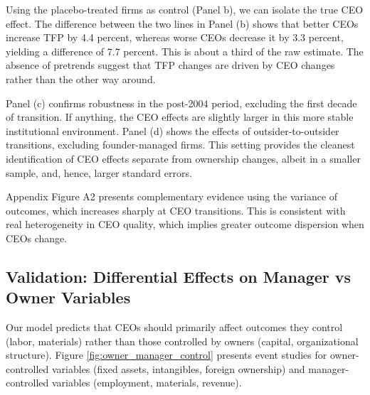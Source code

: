 \documentclass[11pt,a4paper]{article}
\begin{document}
Using the placebo-treated firms as control (Panel b), we can isolate the true CEO effect. The difference between the two lines in Panel (b) shows that better CEOs increase TFP by 4.4 percent, whereas worse CEOs decrease it by 3.3 percent, yielding a difference of 7.7 percent. This is about a third of the raw estimate. The absence of pretrends suggest that TFP changes are driven by CEO changes rather than the other way around.

Panel (c) confirms robustness in the post-2004 period, excluding the first decade of transition. If anything, the CEO effects are slightly larger in this more stable institutional environment. Panel (d) shows the effects of outsider-to-outsider transitions, excluding founder-managed firms. This setting provides the cleanest identification of CEO effects separate from ownership changes, albeit in a smaller sample, and, hence, larger standard errors.

Appendix Figure A2 presents complementary evidence using the variance of outcomes, which increases sharply at CEO transitions. This is consistent with real heterogeneity in CEO quality, which implies greater outcome dispersion when CEOs change.

\subsection{Validation: Differential Effects on Manager vs Owner Variables}

Our model predicts that CEOs should primarily affect outcomes they control (labor, materials) rather than those controlled by owners (capital, organizational structure). Figure \ref{fig:owner_manager_control} presents event studies for owner-controlled variables (fixed assets, intangibles, foreign ownership) and manager-controlled variables (employment, materials, revenue).
\end{document}
